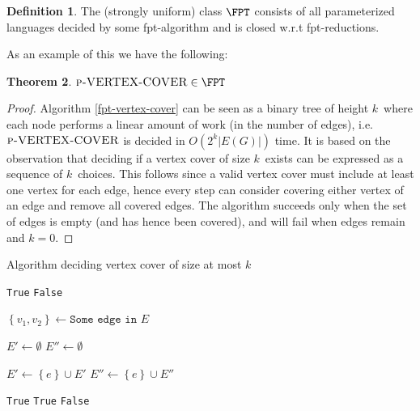 \documentclass[a4paper,11pt]{report}
\theoremstyle{plain}
\newtheorem{thm}{Theorem}[chapter] %
\theoremstyle{definition}
\newtheorem{defn}[thm]{Definition} %
\begin{document}
\begin{defn}
The (strongly uniform) class $\FPT$ consists of all parameterized languages decided by some fpt-algorithm and is closed w.r.t fpt-reductions.
\end{defn}

As an example of this we have the following:
\begin{thm}
$\textsc{p-VERTEX-COVER} \in \FPT$
\end{thm}

\begin{proof}
Algorithm \ref{fpt-vertex-cover} can be seen as a binary tree of height $k$ where each node performs a linear amount of work (in the number of edges), i.e. $\textsc{p-VERTEX-COVER}$ is decided in $O(2^k |E(G)|)$ time.
It is based on the observation that deciding if a vertex cover of size $k$ exists can be expressed as a sequence of $k$ choices.
This follows since a valid vertex cover must include at least one vertex for each edge, hence every step can consider covering either vertex of an edge and remove all covered edges.
The algorithm succeeds only when the set of edges is empty (and has hence been covered), and will fail when edges remain and $k = 0$.
\end{proof}

\begin{algorithm}
\begin{algorithmic}
\caption{Algorithm deciding vertex cover of size at most $k$}
\label{fpt-vertex-cover}
    \Return \texttt{True}
    \Return \texttt{False}
\EndIf

\State $\left\{v_1, v_2\right\} \gets \texttt{Some edge in } E$

\State $E'\gets \emptyset$
\State $E''\gets \emptyset$

      \State $E'\gets \left\{e\right\}\cup E'$
  \EndIf
      \State $E''\gets \left\{e\right\}\cup E''$
  \EndIf
\EndFor

    \Return \texttt{True}
    \Return \texttt{True}
\Else {}
    \Return \texttt{False}
\EndIf

\EndProcedure
\end{algorithmic}
\end{algorithm}
\end{document}

